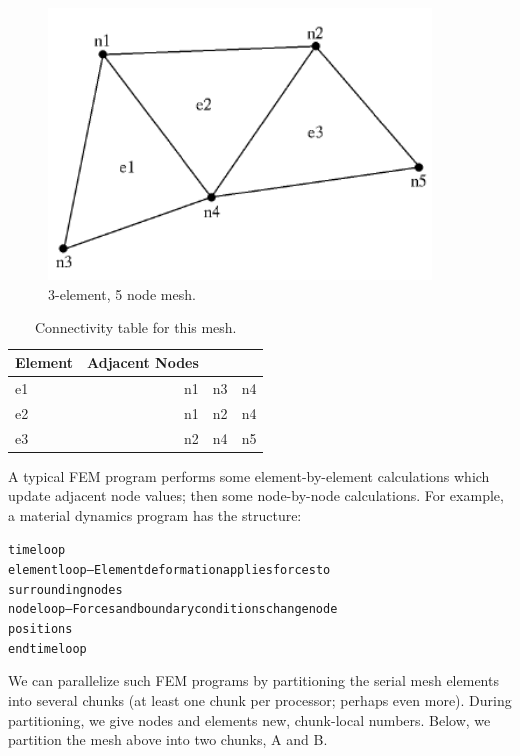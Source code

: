 \documentclass[11pt]{article}
\begin{document}
\begin{figure}
\begin{center}
\includegraphics[width=4in]{simple_mesh}
\end{center}
\caption{3-element, 5 node mesh.}
\label{fig:simplemesh}
\end{figure}

\begin{table}
\begin{tabular}{||l||r|r|r||}
\hline
Element & Adjacent Nodes \\ \hline
e1 & n1 & n3 & n4 \\
e2 & n1 & n2 & n4 \\
e3 & n2 & n4 & n5 \\
\hline
\end{tabular}
\caption{Connectivity table for this mesh.}
\label{table:simplemesh}
\end{table}

A typical FEM program performs some element-by-element calculations which
update adjacent node values; then some node-by-node calculations.  For
example, a material dynamics program has the structure:

\begin{alltt}
     time loop\\
          element loop-- Element deformation applies forces to
          surrounding nodes\\
          node loop-- Forces and boundary conditions change node
          positions\\
     end time loop\\
\end{alltt}

We can parallelize such FEM programs by partitioning the serial mesh
elements into several chunks  (at least one chunk per processor; perhaps
even more).  During partitioning, we give nodes and elements new,
chunk-local numbers.  Below, we partition the mesh above into two chunks, A
and B.
\end{document}
